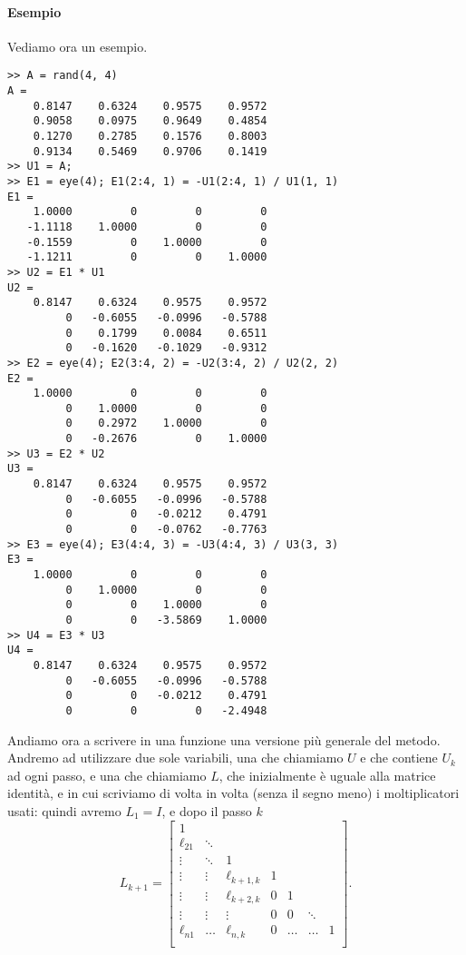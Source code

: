 \documentclass[a4paper]{report}
\theoremstyle{definiton}
\theoremstyle{remark}
\begin{document}
\paragraph{Esempio} Vediamo ora un esempio.
\begin{lstlisting}
>> A = rand(4, 4)
A =
    0.8147    0.6324    0.9575    0.9572
    0.9058    0.0975    0.9649    0.4854
    0.1270    0.2785    0.1576    0.8003
    0.9134    0.5469    0.9706    0.1419
>> U1 = A;
>> E1 = eye(4); E1(2:4, 1) = -U1(2:4, 1) / U1(1, 1)
E1 =
    1.0000         0         0         0
   -1.1118    1.0000         0         0
   -0.1559         0    1.0000         0
   -1.1211         0         0    1.0000
>> U2 = E1 * U1
U2 =
    0.8147    0.6324    0.9575    0.9572
         0   -0.6055   -0.0996   -0.5788
         0    0.1799    0.0084    0.6511
         0   -0.1620   -0.1029   -0.9312
>> E2 = eye(4); E2(3:4, 2) = -U2(3:4, 2) / U2(2, 2)
E2 =
    1.0000         0         0         0
         0    1.0000         0         0
         0    0.2972    1.0000         0
         0   -0.2676         0    1.0000
>> U3 = E2 * U2
U3 =
    0.8147    0.6324    0.9575    0.9572
         0   -0.6055   -0.0996   -0.5788
         0         0   -0.0212    0.4791
         0         0   -0.0762   -0.7763
>> E3 = eye(4); E3(4:4, 3) = -U3(4:4, 3) / U3(3, 3)
E3 =
    1.0000         0         0         0
         0    1.0000         0         0
         0         0    1.0000         0
         0         0   -3.5869    1.0000
>> U4 = E3 * U3
U4 =
    0.8147    0.6324    0.9575    0.9572
         0   -0.6055   -0.0996   -0.5788
         0         0   -0.0212    0.4791
         0         0         0   -2.4948
\end{lstlisting}
Andiamo ora a scrivere in una funzione una versione più generale del metodo. Andremo ad utilizzare due sole variabili, una che chiamiamo $U$ e che contiene $U_k$ ad ogni passo, e una che chiamiamo $L$, che inizialmente è uguale alla matrice identità, e in cui scriviamo di volta in volta (senza il segno meno) i moltiplicatori usati: quindi avremo $L_1=I$, e dopo il passo $k$
\[
    L_{k+1} = \begin{bmatrix}
        1\\
        \ell_{21} & \ddots\\
        \vdots & \ddots & 1\\
        \vdots & \vdots & \ell_{k+1,k} & 1\\
        \vdots & \vdots & \ell_{k+2,k} & 0 & 1\\
        \vdots & \vdots & \vdots & 0 & 0 & \ddots\\
        \ell_{n1} & \dots & \ell_{n,k} & 0 & \dots & \dots & 1\\
    \end{bmatrix}.
\]
\end{document}
